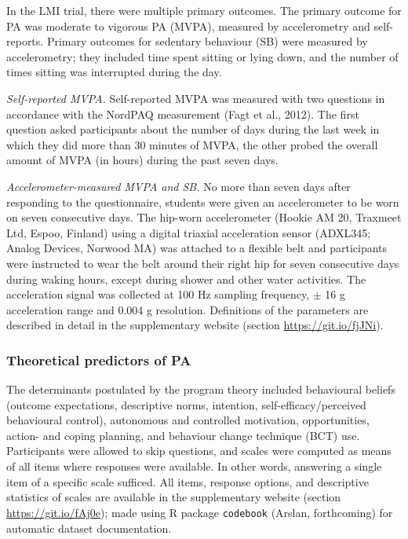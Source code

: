 \documentclass[british,man]{apa6}
\begin{document}
In the LMI trial, there were multiple primary outcomes. The primary outcome for PA was moderate to vigorous PA (MVPA), measured by accelerometry and self-reports. Primary outcomes for sedentary behaviour (SB) were measured by accelerometry; they included time spent sitting or lying down, and the number of times sitting was interrupted during the day.

\emph{Self-reported MVPA.} Self-reported MVPA was measured with two questions in accordance with the NordPAQ measurement (Fagt et al., 2012). The first question asked participants about the number of days during the last week in which they did more than 30 minutes of MVPA, the other probed the overall amount of MVPA (in hours) during the past seven days.

\emph{Accelerometer-measured MVPA and SB.} No more than seven days after responding to the questionnaire, students were given an accelerometer to be worn on seven consecutive days. The hip-worn accelerometer (Hookie AM 20, Traxmeet Ltd, Espoo, Finland) using a digital triaxial acceleration sensor (ADXL345; Analog Devices, Norwood MA) was attached to a flexible belt and participants were instructed to wear the belt around their right hip for seven consecutive days during waking hours, except during shower and other water activities. The acceleration signal was collected at 100 Hz sampling frequency, \(\pm\) 16 g acceleration range and 0.004 g resolution. Definitions of the parameters are described in detail in the supplementary website (section \url{https://git.io/fjJNi}).

\hypertarget{theoretical-predictors-of-pa}{%
\subsubsection{Theoretical predictors of PA}\label{theoretical-predictors-of-pa}}

The determinants postulated by the program theory included behavioural beliefs (outcome expectations, descriptive norms, intention, self-efficacy/perceived behavioural control), autonomous and controlled motivation, opportunities, action- and coping planning, and behaviour change technique (BCT) use. Participants were allowed to skip questions, and scales were computed as means of all items where responses were available. In other words, answering a single item of a specific scale sufficed. All items, response options, and descriptive statistics of scales are available in the supplementary website (section \url{https://git.io/fAj0e}); made using R package \texttt{codebook} (Arslan, forthcoming) for automatic dataset documentation.
\end{document}
